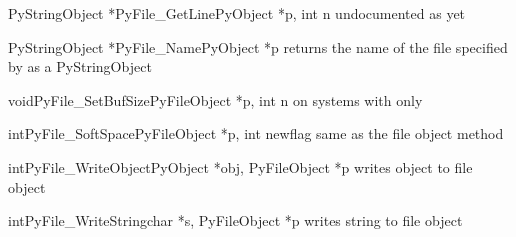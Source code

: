 \begin{cfuncdesc}{PyStringObject *}{PyFile_GetLine}{PyObject *p, int n}
undocumented as yet
\end{cfuncdesc}

\begin{cfuncdesc}{PyStringObject *}{PyFile_Name}{PyObject *p}
returns the name of the file specified by  as a 
PyStringObject
\end{cfuncdesc}

\begin{cfuncdesc}{void}{PyFile_SetBufSize}{PyFileObject *p, int n}
on systems with  only
\end{cfuncdesc}

\begin{cfuncdesc}{int}{PyFile_SoftSpace}{PyFileObject *p, int newflag}
same as the file object method 
\end{cfuncdesc}

\begin{cfuncdesc}{int}{PyFile_WriteObject}{PyObject *obj, PyFileObject *p}
writes object  to file object 
\end{cfuncdesc}

\begin{cfuncdesc}{int}{PyFile_WriteString}{char *s, PyFileObject *p}
writes string  to file object 
\end{cfuncdesc}




